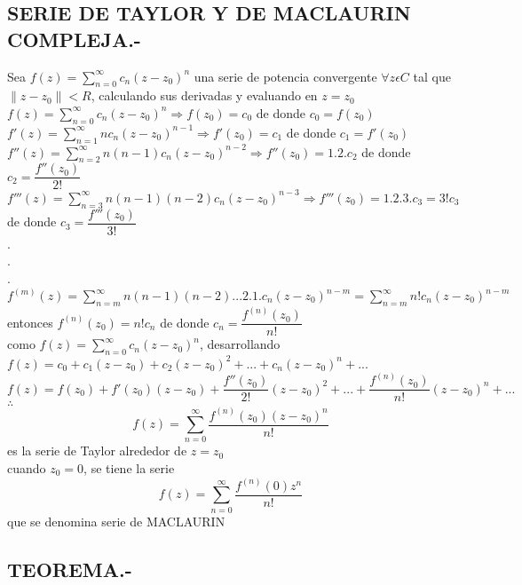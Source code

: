 \documentclass[10pt,a4paper]{article}
\begin{document}
\subsection{SERIE DE TAYLOR Y DE MACLAURIN COMPLEJA.-}
Sea  $\displaystyle{f(z) = \sum_{n = 0}^{\infty} c_n (z-z_0)^n}$ una serie de potencia convergente $\forall z \epsilon C$ tal que $\parallel z - z_0 \parallel < R$, calculando sus derivadas y evaluando en $z = z_0$ \\
$\displaystyle{f(z) = \sum_{n = 0}^{\infty} c_n (z-z_0)^n} \Rightarrow f(z_0) = c_0$ de donde $c_0 = f(z_0)$ \\
$\displaystyle{f'(z) = \sum_{n = 1}^{\infty} n c_n (z-z_0)^{n-1}} \Rightarrow f'(z_0) = c_1$ de donde $c_1 = f'(z_0)$ \\ 
$\displaystyle{f''(z) = \sum_{n = 2}^{\infty} n (n-1) c_n (z-z_0)^{n-2}} \Rightarrow f''(z_0) = 1.2.c_2$ de donde $c_2 = \dfrac{f''(z_0)}{2!}$ \\ 
$\displaystyle{f'''(z) = \sum_{n = 3}^{\infty} n (n-1)(n-2) c_n (z-z_0)^{n-3}} \Rightarrow f'''(z_0) = 1.2.3.c_3 = 3! c_3$ de donde $c_3 = \dfrac{f'''(z_0)}{3!}$ \\ 
.\\
.\\
.\\
$\displaystyle{f^{(m)}(z) = \sum_{n = m}^{\infty} n (n-1)(n-2)...2.1.c_n (z-z_0)^{n-m} = \sum_{n = m}^{\infty} n! c_n (z-z_0)^{n-m}}$ entonces  $f^(n) (z_0) = n! c_n$ de donde $c_n = \dfrac{f^{(n)} (z_0)}{n!}$ \\
como  $\displaystyle{f(z) = \sum_{n = 0}^{\infty} c_n (z-z_0)^n}$, desarrollando \\
$\displaystyle{f(z) = c_0 + c_1 (z-z_0) + c_2 (z-z_0)^2 + ... + c_n(z-z_0)^n+...}$\\
$\displaystyle{f(z) = f(z_0) +f'(z_0)(z-z_0) + \dfrac{f''(z_0)}{2!}(z-z_0)^2 + ... + \dfrac{f^{(n)}(z_0)}{n!}(z-z_0)^n+ ... }$\\

$\therefore$ \begin{equation}
f(z) = \sum_{n = 0}^{\infty} \dfrac{f^{(n)} (z_0)(z-z_0)^n}{n!}
\end{equation}
es la serie de Taylor alrededor de $z = z_0$\\
cuando $z_0 = 0$, se tiene la serie \begin{equation}
f(z) = \sum_{n = 0}^{\infty} \dfrac{f^{(n)}(0) z^n}{n!}
\end{equation}
que se denomina serie de MACLAURIN
\subsection{TEOREMA.-}
\end{document}
